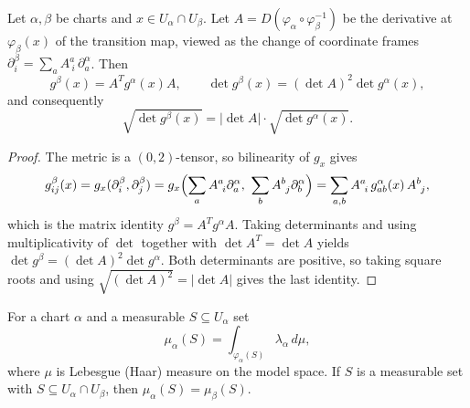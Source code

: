 \begin{lemma}
\label{lem:volume-density-change}
\leanok



Let $\alpha,\beta$ be charts and $x\in U_\alpha\cap U_\beta$. Let
$A=D(\varphi_\alpha\circ\varphi_\beta^{-1})$ be the derivative at $\varphi_\beta(x)$ of the
transition map, viewed as the change of coordinate frames
$\partial^\beta_i=\sum_a A^a_{\ i}\,\partial^\alpha_a$. Then
$$g^\beta(x)=A^{T}g^\alpha(x)A,\qquad
\det g^\beta(x)=(\det A)^2\det g^\alpha(x),$$
and consequently
$$\sqrt{\det g^\beta(x)}=\lvert\det A\rvert\cdot\sqrt{\det g^\alpha(x)}.$$
\end{lemma}

\begin{proof}
\sketch
{}
\leanok
The metric is a $(0,2)$-tensor, so bilinearity of $g_x$ gives
$$g^\beta_{ij}(x)=g_x(\partial^\beta_i,\partial^\beta_j)
=g_x\Bigl(\sum_a A^a_{\ i}\partial^\alpha_a,\ \sum_b A^b_{\ j}\partial^\alpha_b\Bigr)
=\sum_{a,b}A^a_{\ i}\,g^\alpha_{ab}(x)\,A^b_{\ j},$$
which is the matrix identity $g^\beta=A^{T}g^\alpha A$. Taking determinants and using
multiplicativity of $\det$ together with $\det A^{T}=\det A$ yields
$\det g^\beta=(\det A)^2\det g^\alpha$. Both determinants are positive, so taking square
roots and using $\sqrt{(\det A)^2}=\lvert\det A\rvert$ gives the last identity.
\end{proof}

\begin{lemma}
\label{lem:riemannian-measure-well-defined}
\leanok



For a chart $\alpha$ and a measurable $S\subseteq U_\alpha$ set
$$\mu_\alpha(S)=\int_{\varphi_\alpha(S)}\lambda_\alpha\,d\mu ,$$
where $\mu$ is Lebesgue (Haar) measure on the model space. If $S$ is a measurable set with
$S\subseteq U_\alpha\cap U_\beta$, then $\mu_\alpha(S)=\mu_\beta(S)$.
\end{lemma}

